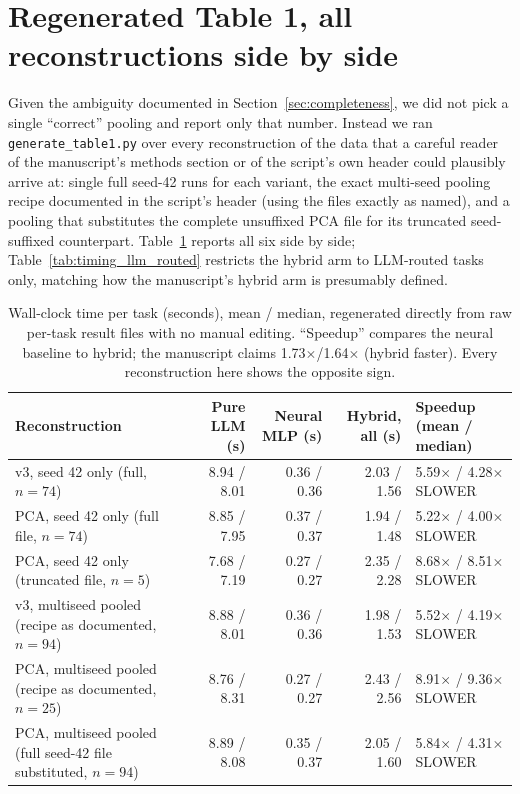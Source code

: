\documentclass{jmlr}
\begin{document}
\section{Regenerated Table 1, all reconstructions side by side}

Given the ambiguity documented in Section~\ref{sec:completeness}, we did
not pick a single ``correct'' pooling and report only that number.
Instead we ran \texttt{generate\_table1.py} over every reconstruction of
the data that a careful reader of the manuscript's methods section or of
the script's own header could plausibly arrive at: single full seed-42
runs for each variant, the exact multi-seed pooling recipe documented in
the script's header (using the files exactly as named), and a pooling that
substitutes the complete unsuffixed PCA file for its truncated
seed-suffixed counterpart. Table~\ref{tab:timing} reports all six side by
side; Table~\ref{tab:timing_llm_routed} restricts the hybrid arm to
LLM-routed tasks only, matching how the manuscript's hybrid arm is
presumably defined.

\begin{table}[htbp]
\centering
\small
\caption{Wall-clock time per task (seconds), mean / median, regenerated
directly from raw per-task result files with no manual editing. ``Speedup''
compares the neural baseline to hybrid; the manuscript claims
1.73$\times$/1.64$\times$ (hybrid faster). Every reconstruction here shows
the opposite sign.}
\label{tab:timing}
\begin{tabular}{lrrrl}
\toprule
Reconstruction & Pure LLM (s) & Neural MLP (s) & Hybrid, all (s) & Speedup (mean / median) \\
\midrule
v3, seed 42 only (full, $n{=}74$) & 8.94 / 8.01 & 0.36 / 0.36 & 2.03 / 1.56 & 5.59$\times$ / 4.28$\times$ SLOWER \\
PCA, seed 42 only (full file, $n{=}74$) & 8.85 / 7.95 & 0.37 / 0.37 & 1.94 / 1.48 & 5.22$\times$ / 4.00$\times$ SLOWER \\
PCA, seed 42 only (truncated file, $n{=}5$) & 7.68 / 7.19 & 0.27 / 0.27 & 2.35 / 2.28 & 8.68$\times$ / 8.51$\times$ SLOWER \\
v3, multiseed pooled (recipe as documented, $n{=}94$) & 8.88 / 8.01 & 0.36 / 0.36 & 1.98 / 1.53 & 5.52$\times$ / 4.19$\times$ SLOWER \\
PCA, multiseed pooled (recipe as documented, $n{=}25$) & 8.76 / 8.31 & 0.27 / 0.27 & 2.43 / 2.56 & 8.91$\times$ / 9.36$\times$ SLOWER \\
PCA, multiseed pooled (full seed-42 file substituted, $n{=}94$) & 8.89 / 8.08 & 0.35 / 0.37 & 2.05 / 1.60 & 5.84$\times$ / 4.31$\times$ SLOWER \\
\bottomrule
\end{tabular}
\end{table}
\end{document}
